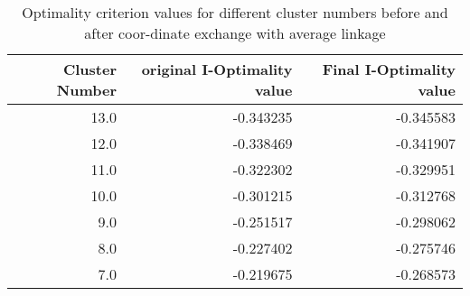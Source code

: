 \begin{table}[htbp]
\centering
\begin{tabular}{rrr}
\toprule
   Cluster Number &   original I-Optimality value &   Final I-Optimality value \\
\midrule
             13.0 &                     -0.343235 &                  -0.345583 \\
             12.0 &                     -0.338469 &                  -0.341907 \\
             11.0 &                     -0.322302 &                  -0.329951 \\
             10.0 &                     -0.301215 &                  -0.312768 \\
              9.0 &                     -0.251517 &                  -0.298062 \\
              8.0 &                     -0.227402 &                  -0.275746 \\
              7.0 &                     -0.219675 &                  -0.268573 \\
\bottomrule
\end{tabular}
\caption{Optimality criterion values for different cluster numbers before and after coor-dinate exchange with average linkage}
\label{tab:Optimality criterion values for different cluster numbers before and after coor-dinate exchange with average linkage}
\end{table}